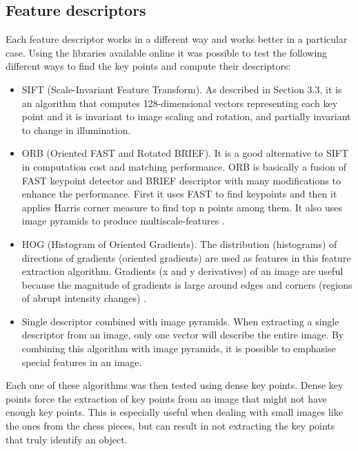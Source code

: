 \documentclass{l4proj}
\begin{document}
\pagebreak
\subsection{Feature descriptors}

Each feature descriptor works in a different way and works better in a particular case. Using the libraries available online it was possible to test the following different ways to find the key points and compute their descriptors:

\begin{itemize}

	\item SIFT (Scale-Invariant Feature Transform). As described in Section 3.3, it is an algorithm that computes 128-dimensional vectors representing each key point and it is invariant to image scaling and rotation, and partially invariant to change in illumination.

	\item ORB (Oriented FAST and Rotated BRIEF). It is a good alternative to SIFT in computation cost and matching performance. ORB is basically a fusion of FAST keypoint detector and BRIEF descriptor with many modifications to enhance the performance. First it uses FAST to find keypoints and then it applies Harris corner measure to find top n points among them. It also uses image pyramids to produce multiscale-features \cite{ORB}.

	
	\item HOG (Histogram of Oriented Gradients). The distribution (histograms) of directions of gradients (oriented gradients) are used as features in this feature extraction algorithm. Gradients (x and y derivatives) of an image are useful because the magnitude of gradients is large around edges and corners (regions of abrupt intensity changes) \cite{HOG}.

	\item Single descriptor combined with image pyramids. When extracting a single descriptor from an image, only one vector will describe the entire image. By combining this algorithm with image pyramids, it is possible to emphasise special features in an image.

\end{itemize}

Each one of these algorithms was then tested using dense key points. Dense key points force the extraction of key points from an image that might not have enough key points. This is especially useful when dealing with small images like the ones from the chess pieces, but can result in not extracting the key points that truly identify an object.
\end{document}
